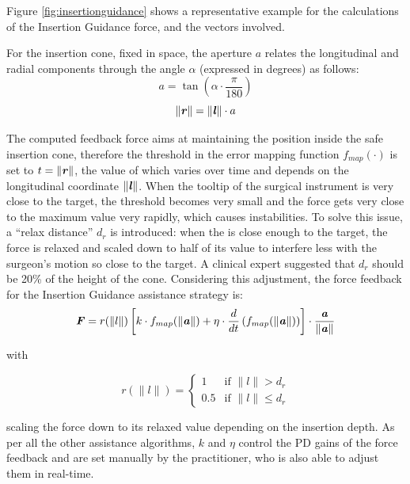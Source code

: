 \documentclass[../main.tex]{subfiles}
\begin{document}
Figure \ref{fig:insertionguidance} shows a representative example for the calculations of the Insertion Guidance \vf force, and the vectors involved.

For the insertion cone, fixed in space, the aperture $a$ relates the longitudinal and radial components through the angle $\alpha$ (expressed in degrees) as follows:
\begin{equation}
    a = \tan\left(\alpha\cdot\frac{\pi}{180}\right)
\end{equation}
\begin{equation}
    \|\textbf{\textit{r}}\| = \|\textbf{\textit{l}}\|\cdot a
\end{equation}


The computed feedback force aims at maintaining the \ee position inside the safe insertion cone, therefore the threshold in the error mapping function $f_{map}(\cdot)$ is set to $t = \|\textbf{\textit{r}}\|$, the value of which varies over time and depends on the longitudinal coordinate $\|\textbf{\textit{l}}\|$. When the tooltip of the surgical instrument is very close to the target, the threshold becomes very small and the force gets very close to the maximum value very rapidly, which causes instabilities. To solve this issue, a ``relax distance'' $d_r$ is introduced: when the \ee is close enough to the target, the force is relaxed and scaled down to half of its value to interfere less with the surgeon's motion so close to the target. A clinical expert suggested that $d_r$ should be 20\% of the height of the cone. Considering this adjustment, the force feedback for the Insertion Guidance assistance strategy is:
\begin{equation}
    \textbf{\textit{F}} = r(\|l\|)\left[k\cdot f_{map}(\|\textbf{\textit{a}}\|) + \eta\cdot \frac{d}{dt} \left( f_{map}(\|\textbf{\textit{a}}\|)\right)\right]\cdot \frac{\textbf{\textit{a}}}{\|\textbf{\textit{a}}\|}
    \label{eq:insertionguidance}
\end{equation}

with

\begin{equation}
    r(\|l\|) = 
    \begin{cases}
        1 & \text{if } \|l\| > d_r \\
        0.5 & \text{if } \|l\| \leq d_r
    \end{cases}
\end{equation}

scaling the force down to its relaxed value depending on the insertion depth. As per all the other assistance algorithms, $k$ and $\eta$ control the PD gains of the force feedback and are set manually by the practitioner, who is also able to adjust them in real-time.
\end{document}
